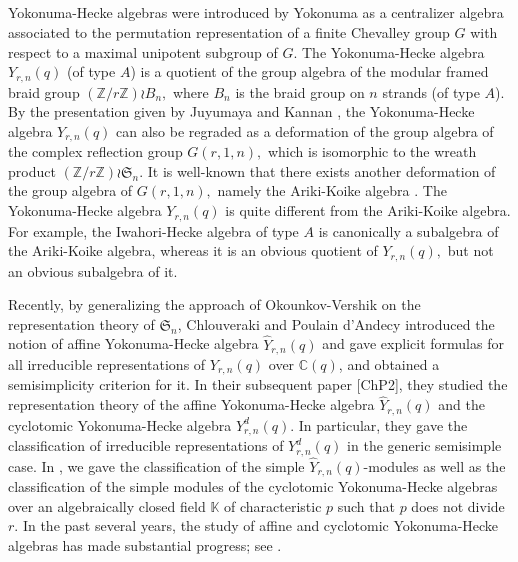 \documentclass[11pt, reqno]{amsart} \textwidth=14.9cm \oddsidemargin=1cm \evensidemargin=1cm
\theoremstyle{definition}
\numberwithin{equation}{section}
\begin{document}

\subsection{}
Yokonuma-Hecke algebras were introduced by Yokonuma \cite{Yo} as a centralizer algebra associated to the permutation representation of a finite Chevalley group $G$ with respect to a maximal unipotent subgroup of $G$. The Yokonuma-Hecke algebra $Y_{r,n}(q)$ (of type $A$) is a quotient of the group algebra of the modular framed braid group $(\mathbb{Z}/r\mathbb{Z})\wr B_{n},$ where $B_{n}$ is the braid group on $n$ strands (of type $A$). By the presentation given by Juyumaya and Kannan \cite{Ju1, Ju2, JuK}, the Yokonuma-Hecke algebra $Y_{r,n}(q)$ can also be regraded as a deformation of the group algebra of the complex reflection group $G(r,1,n),$ which is isomorphic to the wreath product $(\mathbb{Z}/r\mathbb{Z})\wr \mathfrak{S}_{n}$. It is well-known that there exists another deformation of the group algebra of $G(r,1,n),$ namely the Ariki-Koike algebra \cite{AK}. The Yokonuma-Hecke algebra $Y_{r,n}(q)$ is quite different from the Ariki-Koike algebra.  For example, the Iwahori-Hecke algebra of type $A$ is canonically a subalgebra of the Ariki-Koike algebra, whereas it is an obvious quotient of $Y_{r,n}(q),$ but not an obvious subalgebra of it.

Recently, by generalizing the approach of Okounkov-Vershik \cite{OV} on the representation theory of $\mathfrak{S}_n$, Chlouveraki and Poulain d'Andecy \cite{ChP1} introduced the notion of affine Yokonuma-Hecke algebra $\widehat{Y}_{r,n}(q)$ and gave explicit formulas for all irreducible representations of $Y_{r,n}(q)$ over $\mathbb{C}(q)$, and obtained a semisimplicity criterion for it. In their subsequent paper [ChP2], they studied the representation theory of the affine Yokonuma-Hecke algebra $\widehat{Y}_{r,n}(q)$ and the cyclotomic Yokonuma-Hecke algebra $Y_{r,n}^{d}(q)$. In particular, they gave the classification of irreducible representations of $Y_{r,n}^{d}(q)$ in the generic semisimple case. In \cite{CW}, we gave the classification of the simple $\widehat{Y}_{r,n}(q)$-modules as well as the classification of the simple modules of the cyclotomic Yokonuma-Hecke algebras over an algebraically closed field $\mathbb{K}$ of characteristic $p$ such that $p$ does not divide $r.$ In the past several years, the study of affine and cyclotomic Yokonuma-Hecke algebras has made substantial progress; see \cite{ChP1, ChP2, ChS, C, CW, ER, JP, Lu2, Ro}.
\end{document}
